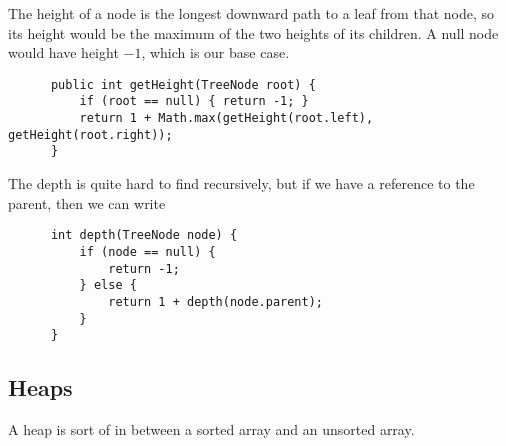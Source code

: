   \begin{definition}
    The height of a node is the longest downward path to a leaf from that node, so its height would be the maximum of the two heights of its children. A null node would have height $-1$, which is our base case. 
    \begin{lstlisting}
      public int getHeight(TreeNode root) {
          if (root == null) { return -1; }
          return 1 + Math.max(getHeight(root.left), getHeight(root.right)); 
      }
    \end{lstlisting}
  \end{definition}

  \begin{definition}
    The depth is quite hard to find recursively, but if we have a reference to the parent, then we can write 
    \begin{lstlisting}
      int depth(TreeNode node) {
          if (node == null) {
              return -1;
          } else {
              return 1 + depth(node.parent);
          }
      }
    \end{lstlisting}
  \end{definition}

\subsection{Heaps}

  A heap is sort of in between a sorted array and an unsorted array. 

